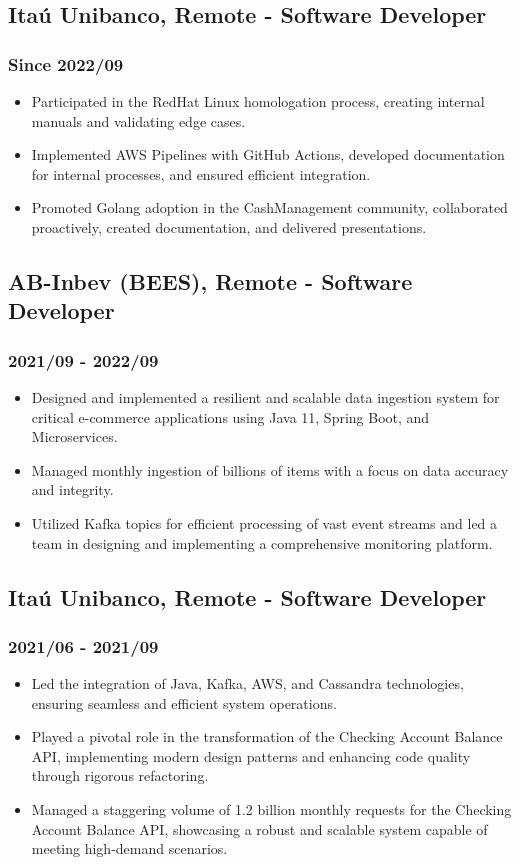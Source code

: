 \documentclass[a4paper,10pt]{article}
\begin{document}
\subsection*{Itaú Unibanco, Remote - Software Developer}
\subsubsection*{Since 2022/09}
\begin{itemize}
    \item Participated in the RedHat Linux homologation process, creating internal manuals and validating edge cases.
    \item Implemented AWS Pipelines with GitHub Actions, developed documentation for internal processes, and ensured efficient integration.
    \item Promoted Golang adoption in the CashManagement community, collaborated proactively, created documentation, and delivered presentations.
\end{itemize}

\subsection*{AB-Inbev (BEES), Remote - Software Developer}
\subsubsection*{2021/09 - 2022/09}
\begin{itemize}
    \item Designed and implemented a resilient and scalable data ingestion system for critical e-commerce applications using Java 11, Spring Boot, and Microservices.
    \item Managed monthly ingestion of billions of items with a focus on data accuracy and integrity.
    \item Utilized Kafka topics for efficient processing of vast event streams and led a team in designing and implementing a comprehensive monitoring platform.
\end{itemize}

\subsection*{Itaú Unibanco, Remote - Software Developer}
\subsubsection*{2021/06 - 2021/09}
\begin{itemize}
    \item Led the integration of Java, Kafka, AWS, and Cassandra technologies, ensuring seamless and efficient system operations.
    \item Played a pivotal role in the transformation of the Checking Account Balance API, implementing modern design patterns and enhancing code quality through rigorous refactoring.
    \item Managed a staggering volume of 1.2 billion monthly requests for the Checking Account Balance API, showcasing a robust and scalable system capable of meeting high-demand scenarios.
\end{itemize}
\end{document}
